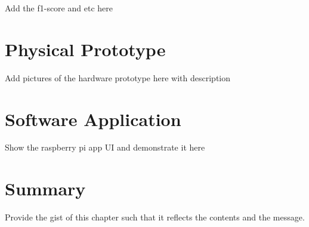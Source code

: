 Add the f1-score and etc here

\section{Physical Prototype}

Add pictures of the hardware prototype here with description

\section{Software Application}

Show the raspberry pi app UI and demonstrate it here 

\section{Summary}

Provide the gist of this chapter such that it reflects the contents and the message.
